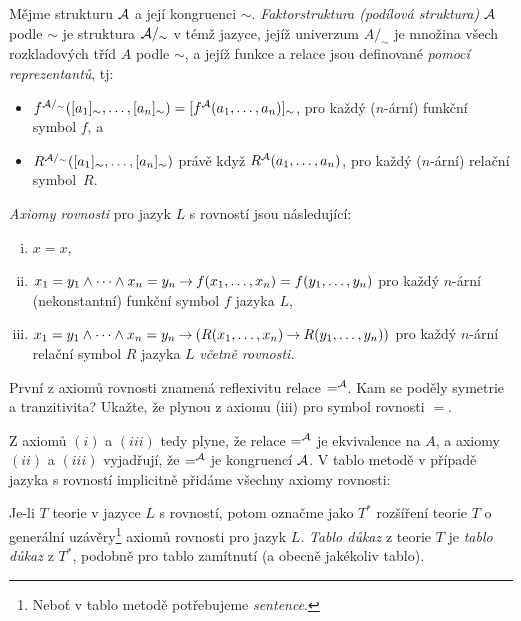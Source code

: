 \begin{definition}[Faktorstruktura]
    Mějme strukturu $\mathcal{A}$ a její kongruenci $\sim$. \emph{Faktorstruktura (podílová struktura)} $\mathcal{A}$ podle $\sim$ je struktura $\mathcal{A}/_\sim$ v témž jazyce, jejíž univerzum $A/_\sim$ je množina všech rozkladových tříd $A$ podle $\sim$, a jejíž funkce a relace jsou definované \emph{pomocí reprezentantů}, tj:
    \begin{itemize}
        \item $f^{\mathcal{A}/_\sim}([a_1]_\sim,\dots,[a_n]_\sim)=[f^{\mathcal{A}}(a_1,\dots,a_n)]_\sim$, pro každý ($n$-ární) funkční symbol $f$, a
        \item $R^{\mathcal{A}/_\sim}([a_1]_\sim,\dots,[a_n]_\sim)$ právě když $R^{\mathcal{A}}(a_1,\dots,a_n)$, pro každý ($n$-ární) relační symbol~$R$.
    \end{itemize} 
    
\end{definition}


\begin{definition}
    \emph{Axiomy rovnosti} pro jazyk $L$ s rovností jsou následující:
    \begin{enumerate}[(i)]
        \item $x=x$,
        \item $x_1=y_1\land\cdots\land x_n=y_n\mathbin{\rightarrow} f(x_1,\dots,x_n)=f(y_1,\dots,y_n)$ pro každý $n$-ární (nekonstantní) funkční symbol $f$ jazyka $L$,
        \item $x_1=y_1\land\cdots\land x_n=y_n\mathbin{\rightarrow} (R(x_1,\dots,x_n)\mathbin{\rightarrow} R(y_1,\dots,y_n))$ pro každý $n$-ární relační symbol $R$ jazyka $L$ \emph{včetně rovnosti}.
    \end{enumerate}
\end{definition}

\begin{exercise}
    První z axiomů rovnosti znamená reflexivitu relace $=^{\mathcal{A}}$. Kam se poděly symetrie a tranzitivita? Ukažte, že plynou z axiomu (iii) pro symbol rovnosti $=$.
\end{exercise}

Z axiomů $(i)$ a $(iii)$ tedy plyne, že relace $=^{\mathcal{A}}$ je ekvivalence na $A$, a axiomy $(ii)$ a $(iii)$ vyjadřují, že $=^{\mathcal{A}}$ je kongruencí $\mathcal{A}$. V tablo metodě v případě jazyka s rovností implicitně přidáme všechny axiomy rovnosti:

\begin{definition}
    Je-li $T$ teorie v jazyce $L$ s rovností, potom označme jako $T^*$ rozšíření teorie $T$ o generální uzávěry\footnote{Neboť v tablo metodě potřebujeme \emph{sentence}.} axiomů rovnosti pro jazyk $L$. \emph{Tablo důkaz} z teorie $T$ je \emph{tablo důkaz} z $T^*$, podobně pro tablo zamítnutí (a obecně jakékoliv tablo).    
\end{definition}

